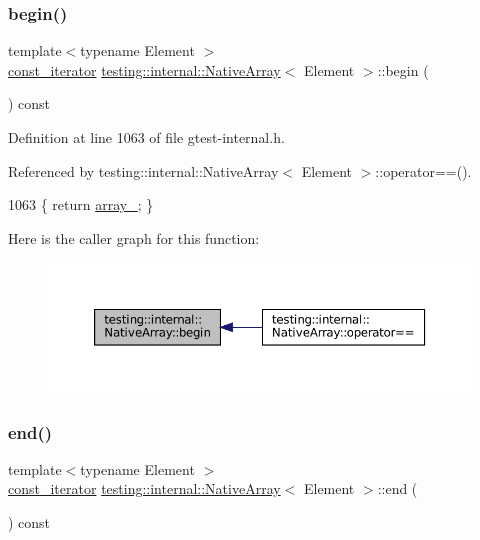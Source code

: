 \subsubsection{\texorpdfstring{begin()}{begin()}}
{\footnotesize\ttfamily template$<$typename Element $>$ \\
\hyperlink{classtesting_1_1internal_1_1NativeArray_a9ce7c8408460d7158a2870456d134557}{const\+\_\+iterator} \hyperlink{classtesting_1_1internal_1_1NativeArray}{testing\+::internal\+::\+Native\+Array}$<$ Element $>$\+::begin (\begin{DoxyParamCaption}{ }\end{DoxyParamCaption}) const\hspace{0.3cm}{\ttfamily [inline]}}



Definition at line 1063 of file gtest-\/internal.\+h.



Referenced by testing\+::internal\+::\+Native\+Array$<$ Element $>$\+::operator==().


\begin{DoxyCode}
1063 \{ \textcolor{keywordflow}{return} \hyperlink{classtesting_1_1internal_1_1NativeArray_adadc025fbbbd43904d4036991019f18f}{array\_}; \}
\end{DoxyCode}
Here is the caller graph for this function\+:
\nopagebreak
\begin{figure}[H]
\begin{center}
\leavevmode
\includegraphics[width=350pt]{classtesting_1_1internal_1_1NativeArray_a3046d93cfa23097e7b7c91f5f982dc78_icgraph}
\end{center}
\end{figure}
\mbox{\label{classtesting_1_1internal_1_1NativeArray_ae1cda748e49c6906421c6183c4d07c5a}} 
\subsubsection{\texorpdfstring{end()}{end()}}
{\footnotesize\ttfamily template$<$typename Element $>$ \\
\hyperlink{classtesting_1_1internal_1_1NativeArray_a9ce7c8408460d7158a2870456d134557}{const\+\_\+iterator} \hyperlink{classtesting_1_1internal_1_1NativeArray}{testing\+::internal\+::\+Native\+Array}$<$ Element $>$\+::end (\begin{DoxyParamCaption}{ }\end{DoxyParamCaption}) const\hspace{0.3cm}{\ttfamily [inline]}}



